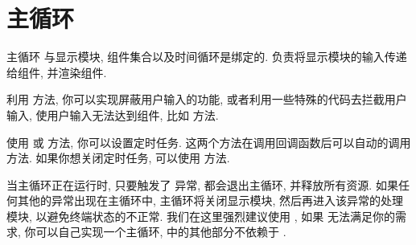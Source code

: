 \section{主循环}
主循环  与显示模块, 组件集合以及时间循环是绑定的.  负责将显示模块的输入传递给组件, 并渲染组件.

利用  方法, 你可以实现屏蔽用户输入的功能, 或者利用一些特殊的代码去拦截用户输入, 使用户输入无法达到组件, 比如  方法.

使用  或  方法, 你可以设置定时任务. 这两个方法在调用回调函数后可以自动的调用  方法. 如果你想关闭定时任务, 可以使用  方法.

当主循环正在运行时, 只要触发了  异常, 都会退出主循环, 并释放所有资源. 如果任何其他的异常出现在主循环中, 主循环将关闭显示模块, 然后再进入该异常的处理模块, 以避免终端状态的不正常. 我们在这里强烈建议使用 , 如果  无法满足你的需求, 你可以自己实现一个主循环, \urwid{} 中的其他部分不依赖于 .